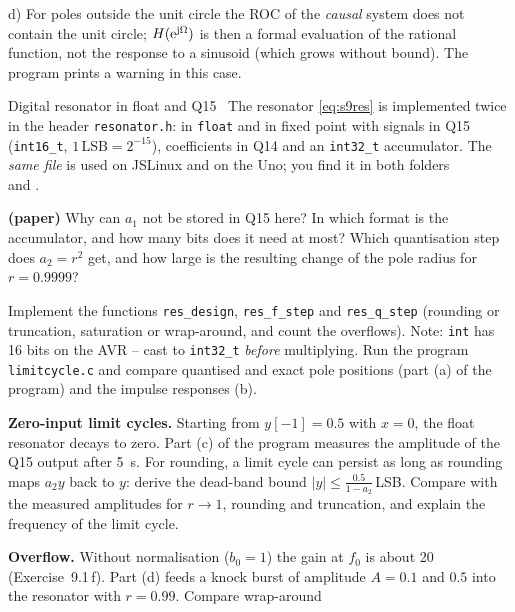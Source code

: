 \begin{solution}
d) For poles outside the unit circle the ROC of the \emph{causal} system does
not contain the unit circle; $H(\mathrm{e}^{\mathrm{j}\Omega})$ is then a formal evaluation
of the rational function, not the response to a sinusoid (which grows without
bound). The program prints a warning in this case.
\end{solution}

\begin{exercise}{Digital resonator in float and Q15}{\Wokwi\ \JSLinux}
The resonator \eqref{eq:s9res} is implemented twice in the header
\texttt{resonator.h}: in \texttt{float} and in fixed point with signals in Q15
(\texttt{int16\_t}, $1\,\mathrm{LSB}=2^{-15}$), coefficients in Q14 and an
\texttt{int32\_t} accumulator. The \emph{same file} is used on JSLinux and
on the Uno; you find it in both folders\\
 and .
\begin{tasks}
  \item \textbf{(paper)} Why can $a_1$ not be stored in Q15 here? In which
    format is the accumulator, and how many bits does it need at most? Which
    quantisation step does $a_2=r^2$ get, and how large is the resulting
    change of the pole radius for $r=0.9999$?
  \item Implement the functions \texttt{res\_design}, \texttt{res\_f\_step}
    and \texttt{res\_q\_step} (rounding or truncation, saturation or
    wrap-around, and count the overflows). Note: \texttt{int} has 16 bits on
    the AVR -- cast to \texttt{int32\_t} \emph{before} multiplying. Run the
    program \texttt{limitcycle.c} and compare quantised and exact pole
    positions (part (a) of the program) and the impulse responses (b).
  \item \textbf{Zero-input limit cycles.} Starting from $y[-1]=0.5$ with
    $x=0$, the float resonator decays to zero. Part (c) of the program
    measures the amplitude of the Q15 output after \SI{5}{s}. For rounding,
    a limit cycle can persist as long as rounding maps $a_2y$ back to $y$:
    derive the dead-band bound $|y|\le\frac{0.5}{1-a_2}$\,LSB. Compare with the
    measured amplitudes for $r\to1$, rounding and truncation, and explain the
    frequency of the limit cycle.
  \item \textbf{Overflow.} Without normalisation ($b_0=1$) the gain at $f_0$ is
    about 20 (Exercise~9.1\,f). Part (d) feeds a knock burst of amplitude
    $A=0.1$ and $0.5$ into the resonator with $r=0.99$. Compare wrap-around

\end{tasks}
\end{exercise}

